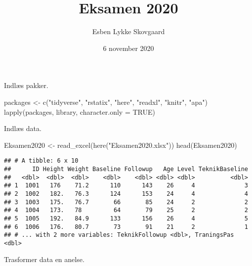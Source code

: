 \documentclass[
]{article}
\title{Eksamen 2020}
\author{Esben Lykke Skovgaard}
\date{6 november 2020}
\newenvironment{Shaded}{\begin{snugshade}}{\end{snugshade}}
\newcommand{\AttributeTok}[1]{\textcolor[rgb]{0.77,0.63,0.00}{#1}}
\newcommand{\ConstantTok}[1]{\textcolor[rgb]{0.00,0.00,0.00}{#1}}
\newcommand{\FunctionTok}[1]{\textcolor[rgb]{0.00,0.00,0.00}{#1}}
\newcommand{\NormalTok}[1]{#1}
\newcommand{\OtherTok}[1]{\textcolor[rgb]{0.56,0.35,0.01}{#1}}
\newcommand{\StringTok}[1]{\textcolor[rgb]{0.31,0.60,0.02}{#1}}
\begin{document}
\maketitle

Indlæs pakker.

\begin{Shaded}
\begin{Highlighting}[]
\NormalTok{packages }\OtherTok{\textless{}{-}} \FunctionTok{c}\NormalTok{(}\StringTok{"tidyverse"}\NormalTok{, }\StringTok{"rstatix"}\NormalTok{, }\StringTok{"here"}\NormalTok{, }\StringTok{"readxl"}\NormalTok{, }\StringTok{"knitr"}\NormalTok{, }\StringTok{"apa"}\NormalTok{)}
\FunctionTok{lapply}\NormalTok{(packages, library, }\AttributeTok{character.only =} \ConstantTok{TRUE}\NormalTok{)}
\end{Highlighting}
\end{Shaded}

Indlæs data.

\begin{Shaded}
\begin{Highlighting}[]
\NormalTok{Eksamen2020 }\OtherTok{\textless{}{-}}
  \FunctionTok{read\_excel}\NormalTok{(}\FunctionTok{here}\NormalTok{(}\StringTok{"Eksamen2020.xlsx"}\NormalTok{))}
\FunctionTok{head}\NormalTok{(Eksamen2020)}
\end{Highlighting}
\end{Shaded}

\begin{verbatim}
## # A tibble: 6 x 10
##      ID Height Weight Baseline Followup   Age Level TeknikBaseline
##   <dbl>  <dbl>  <dbl>    <dbl>    <dbl> <dbl> <dbl>          <dbl>
## 1  1001   176    71.2      110      143    26     4              3
## 2  1002   182.   76.3      124      153    24     4              4
## 3  1003   175.   76.7       66       85    24     2              2
## 4  1004   173.   78         64       79    25     2              2
## 5  1005   192.   84.9      133      156    26     4              5
## 6  1006   176.   80.7       73       91    21     2              1
## # ... with 2 more variables: TeknikFollowup <dbl>, TraningsPas <dbl>
\end{verbatim}

Trasformer data en anelse.
\end{document}

